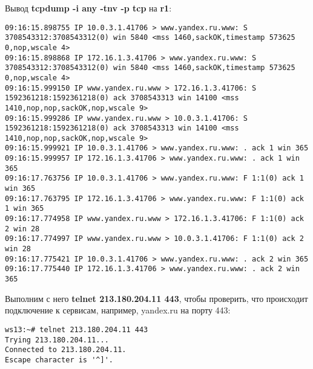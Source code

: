 \documentclass[a4paper,12pt]{article}
\begin{document}
Вывод \textbf{tcpdump -i any -tnv -p tcp} на \textbf{r1}:
\begin{Verbatim}
09:16:15.898755 IP 10.0.3.1.41706 > www.yandex.ru.www: S 3708543312:3708543312(0) win 5840 <mss 1460,sackOK,timestamp 573625 0,nop,wscale 4>
09:16:15.898868 IP 172.16.1.3.41706 > www.yandex.ru.www: S 3708543312:3708543312(0) win 5840 <mss 1460,sackOK,timestamp 573625 0,nop,wscale 4>
09:16:15.999150 IP www.yandex.ru.www > 172.16.1.3.41706: S 1592361218:1592361218(0) ack 3708543313 win 14100 <mss 1410,nop,nop,sackOK,nop,wscale 9>
09:16:15.999286 IP www.yandex.ru.www > 10.0.3.1.41706: S 1592361218:1592361218(0) ack 3708543313 win 14100 <mss 1410,nop,nop,sackOK,nop,wscale 9>
09:16:15.999921 IP 10.0.3.1.41706 > www.yandex.ru.www: . ack 1 win 365
09:16:15.999957 IP 172.16.1.3.41706 > www.yandex.ru.www: . ack 1 win 365
09:16:17.763756 IP 10.0.3.1.41706 > www.yandex.ru.www: F 1:1(0) ack 1 win 365
09:16:17.763795 IP 172.16.1.3.41706 > www.yandex.ru.www: F 1:1(0) ack 1 win 365
09:16:17.774958 IP www.yandex.ru.www > 172.16.1.3.41706: F 1:1(0) ack 2 win 28
09:16:17.774997 IP www.yandex.ru.www > 10.0.3.1.41706: F 1:1(0) ack 2 win 28
09:16:17.775421 IP 10.0.3.1.41706 > www.yandex.ru.www: . ack 2 win 365
09:16:17.775440 IP 172.16.1.3.41706 > www.yandex.ru.www: . ack 2 win 365
\end{Verbatim}

Выполним с него \textbf{telnet 213.180.204.11 443},  чтобы проверить, что
происходит подключение к сервисам, например, yandex.ru на порту 443:
\begin{Verbatim}
ws13:~# telnet 213.180.204.11 443
Trying 213.180.204.11...
Connected to 213.180.204.11.
Escape character is '^]'.
\end{Verbatim}
\end{document}
